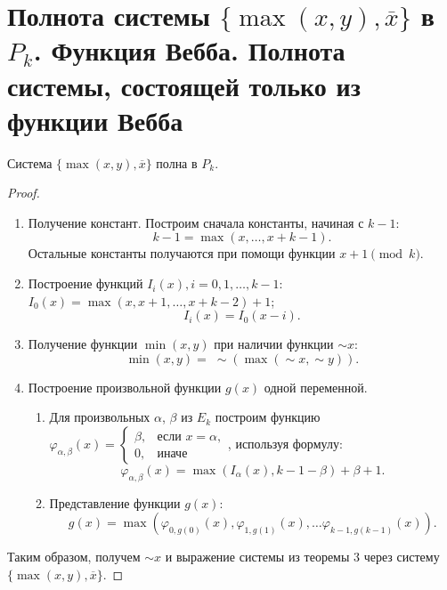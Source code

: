 \section{Полнота системы $\{\max(x, y), \overline{x}\}$ в $P_k$. Функция Вебба. Полнота системы, состоящей только из функции Вебба}

\begin{theorem}
    Система $\{\max(x, y), \overline{x}\}$ полна в $P_k$.
\end{theorem}

\begin{proof}
    \begin{enumerate}
        \item Получение констант.
        Построим сначала константы, начиная с $k - 1$:
        \[
            k-1 = \max(x, \ldots, x+k-1).
        \]
        Остальные константы получаются при помощи функции $x + 1 \pmod k$.
        \item Построение функций $I_i(x), i = 0, 1, \ldots, k - 1$:
        $I_0(x) = \max(x, x+1, \ldots, x+k-2) + 1$;
        \[
            I_i(x) = I_0(x - i).
        \]
        \item Получение функции $\min(x, y)$ при наличии функции $\sim x$:
        \[
            \min(x, y) = \;\sim (\max(\sim x, \sim y)).
        \]
        \item Построение произвольной функции $g(x)$ одной переменной.
        \begin{enumerate}
            \item Для произвольных $\alpha$, $\beta$ из $E_k$ построим функцию 
            $
            \varphi_{\alpha, \beta}(x) = 
            \begin{cases}
            \beta,&\text{если $x = \alpha$},\\
                0,&\text{иначе}
            \end{cases}
            $, используя формулу:
            \[
                \varphi_{\alpha, \beta}(x) = \max(I_\alpha(x), k-1-\beta) + \beta + 1.
            \]
            \item Представление функции $g(x)$:
            \[
                g(x) = \max(\varphi_{0, g(0)}(x), \varphi_{1, g(1)}(x), \ldots \varphi_{k-1, g(k-1)}(x)).
            \]
        \end{enumerate}
    \end{enumerate}
    Таким образом, получем $\sim x$ и выражение системы из теоремы 3 через систему $\{\max(x, y), \overline{x}\}$.
\end{proof}

